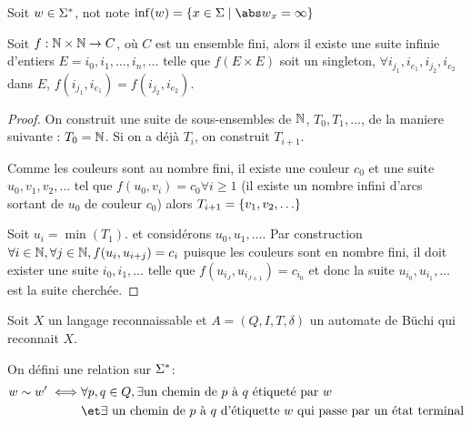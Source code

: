 \begin{notation}
	Soit $w \in \Sigma^{*}$, not note $\inf (w) = \setdef {x \in \alphabet} {{\abs w}_x = \infty}$
\end{notation}



\begin{theorem}
	Soit $f : \mathbb{N} \times \mathbb{N} \to C $, où $C$ est un ensemble fini, alors il existe une suite infinie d'entiers $E = i_0, i_1, \ldots, i_n, \ldots$
	telle que $f(E \times E)$ soit un singleton, \ie $\forall i_{j_1},i_{e_1},i_{j_2},i_{e_2}$ dans $E$, $f(i_{j_1},i_{e_1})=f(i_{j_2},i_{e_2})$.
\end{theorem}

\begin{proof}
	On construit une suite de sous-ensembles de $\mathbb{N}$, $T_0, T_1, \ldots$, de la maniere suivante :
	$T_0 = \mathbb{N}$. Si on a déjà $T_i$, on construit $T_{i+1}$.

	Comme les couleurs sont au nombre fini, il existe une couleur $c_0$ et une suite
	$u_0, v_1, v_2, \ldots$ tel que $f(u_0, v_i) = c_0 \forall i \geq 1$ (il existe un nombre infini d'arcs sortant de $u_0$ de couleur $c_0$)
	alors $T_{i+1} = \left\{v_1, v_2, \ldots\right\}$


	Soit $u_i = \min (T_1)$. et considérons $u_0, u_1, \ldots$. Par construction $\forall i \in \mathbb{N}, \forall j \in \mathbb{N}, f(u_i, u_{i + j}) = c_i$
	puisque les couleurs sont en nombre fini, il doit exister une suite $i_0, i_1, \ldots$ telle que $f(u_{i_J}, u_{i_{J+1}}) = c_{i_0}$
	et donc la suite $u_{i_0},u_{i_1}, \ldots$ est la suite cherchée.
\end{proof}


Soit $X$ un langage reconnaissable et $A = (Q,I,T,\delta)$ un automate de Büchi qui reconnait $X$.


On défini une relation sur $\Sigma^{*}$:
\begin{eqnarray*}
	w \sim w' \iff &\forall p,q \in Q, \exists \text{un chemin de $p$ à $q$ étiqueté par } w \\
	&\et \exists \text{ un chemin de $p$ à $q$ d'étiquette $w$ qui passe par un état terminal}
\end{eqnarray*}


